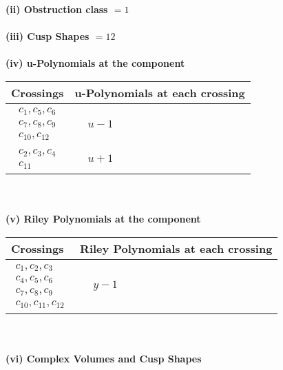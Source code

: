 \documentclass[1p]{elsarticle_modified}
\theoremstyle{definition}
\begin{document}
\flushleft \textbf{(ii) Obstruction class $= 1$}\\~\\
\flushleft \textbf{(iii) Cusp Shapes $= 12$}\\~\\
\newpage\renewcommand{\arraystretch}{1}
\flushleft \textbf{(iv) u-Polynomials at the component}\newline \\
\begin{tabular}{m{50pt}|m{274pt}}
Crossings & \hspace{64pt}u-Polynomials at each crossing \\
\hline $$\begin{aligned}c_{1},c_{5},c_{6}\\c_{7},c_{8},c_{9}\\c_{10},c_{12}\end{aligned}$$&$\begin{aligned}
&u-1
\end{aligned}$\\
\hline $$\begin{aligned}c_{2},c_{3},c_{4}\\c_{11}\end{aligned}$$&$\begin{aligned}
&u+1
\end{aligned}$\\
\hline
\end{tabular}\\~\\
\newpage\renewcommand{\arraystretch}{1}
\flushleft \textbf{(v) Riley Polynomials at the component}\newline \\
\begin{tabular}{m{50pt}|m{274pt}}
Crossings & \hspace{64pt}Riley Polynomials at each crossing \\
\hline $$\begin{aligned}c_{1},c_{2},c_{3}\\c_{4},c_{5},c_{6}\\c_{7},c_{8},c_{9}\\c_{10},c_{11},c_{12}\end{aligned}$$&$\begin{aligned}
&y-1
\end{aligned}$\\
\hline
\end{tabular}\\~\\
\newpage\flushleft \textbf{(vi) Complex Volumes and Cusp Shapes}
\end{document}
